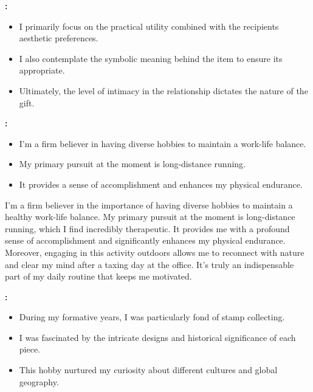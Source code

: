 
\textbf{:}

\begin{itemize}
\tightlist
\item
  I primarily focus on the practical utility combined with the
  recipient\textquotesingle s aesthetic preferences.
\item
  I also contemplate the symbolic meaning behind the item to ensure
  it\textquotesingle s appropriate.
\item
  Ultimately, the level of intimacy in the relationship dictates the
  nature of the gift.
\end{itemize}



\textbf{:}

\begin{itemize}
\tightlist
\item
  I'm a firm believer in having diverse hobbies to maintain a work-life
  balance.
\item
  My primary pursuit at the moment is long-distance running.
\item
  It provides a sense of accomplishment and enhances my physical
  endurance.
\end{itemize}

I'm a firm believer in the importance of having diverse hobbies to
maintain a healthy work-life balance. My primary pursuit at the moment
is long-distance running, which I find incredibly therapeutic. It
provides me with a profound sense of accomplishment and significantly
enhances my physical endurance. Moreover, engaging in this activity
outdoors allows me to reconnect with nature and clear my mind after a
taxing day at the office. It's truly an indispensable part of my daily
routine that keeps me motivated.


\textbf{:}

\begin{itemize}
\tightlist
\item
  During my formative years, I was particularly fond of stamp
  collecting.
\item
  I was fascinated by the intricate designs and historical significance
  of each piece.
\item
  This hobby nurtured my curiosity about different cultures and global
  geography.
\end{itemize}

